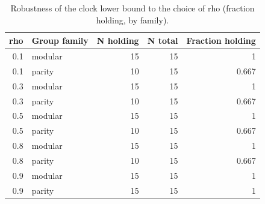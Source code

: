 \begin{table}
\caption{Robustness of the clock lower bound to the choice of rho (fraction holding, by family).}
\label{tab:rhosens}
\begin{tabular}{rlrrr}
\toprule
rho & Group family & N holding & N total & Fraction holding \\
\midrule
0.1 & modular & 15 & 15 & 1 \\
0.1 & parity & 10 & 15 & 0.667 \\
0.3 & modular & 15 & 15 & 1 \\
0.3 & parity & 10 & 15 & 0.667 \\
0.5 & modular & 15 & 15 & 1 \\
0.5 & parity & 10 & 15 & 0.667 \\
0.8 & modular & 15 & 15 & 1 \\
0.8 & parity & 10 & 15 & 0.667 \\
0.9 & modular & 15 & 15 & 1 \\
0.9 & parity & 15 & 15 & 1 \\
\bottomrule
\end{tabular}
\end{table}
